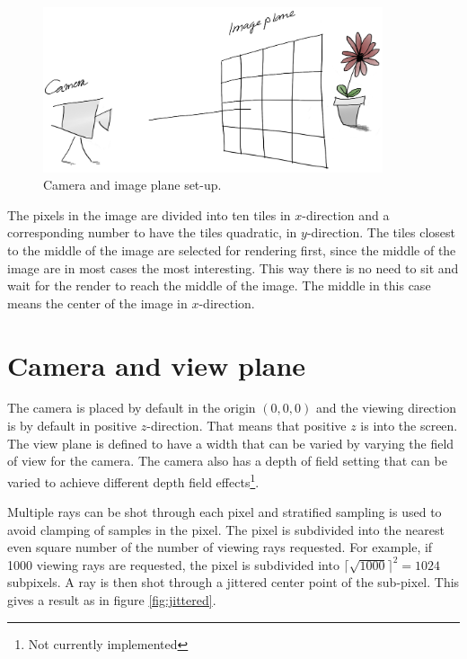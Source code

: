 \documentclass[a4paper]{report}
\begin{document}
\begin{figure}[h]
  \centering
  \includegraphics[width=10cm]{figures/2}
  \caption{Camera and image plane set-up.}
  \label{fig:camera}
\end{figure}

The pixels in the image are divided into ten tiles in \(x\)-direction and
a corresponding number to have the tiles quadratic, in
\(y\)-direction. The tiles closest to the middle of the image are
selected for rendering first, since the middle of the image are in
most cases the most interesting. This way there is no need to sit and
wait for the render to reach the middle of the image. The middle in
this case means the center of the image in \(x\)-direction.

\section{Camera and view plane}
\label{sec:cam}

The camera is placed by default in the origin \((0, 0, 0)\) and the
viewing direction is by default in positive \(z\)-direction. That
means that positive \(z\) is into the screen. The view plane is
defined to have a width that can be varied by varying the field of
view for the camera. The camera also has a depth of field setting that
can be varied to achieve different depth field effects\footnote{Not
  currently implemented}.

Multiple rays can be shot through each pixel and stratified sampling
is used to avoid clamping of samples in the pixel. The pixel is
subdivided into the nearest even square number of the number of
viewing rays requested. For example, if 1000 viewing rays are
requested, the pixel is subdivided into \(\lceil \sqrt{1000}
\rceil^2 = 1024 \) subpixels. A ray is then shot through a jittered
center point of the sub-pixel. This gives a result as in figure \ref{fig:jittered}.
\end{document}
